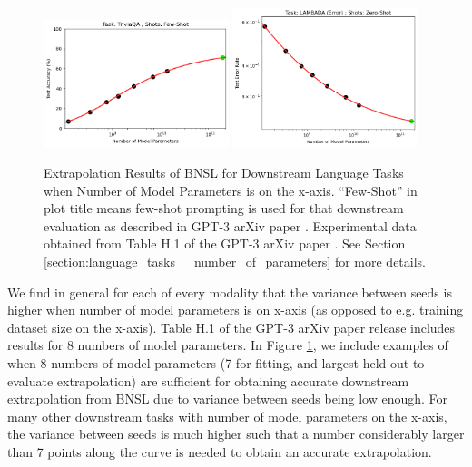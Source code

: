 \documentclass{article} %
\begin{document}
\begin{figure}[htbp]
\includegraphics[width=0.48\textwidth]{figures/gpt-3__parameter_scaling/TriviaQA___Few-Shot.png}
\includegraphics[width=0.48\textwidth]{figures/gpt-3__parameter_scaling/LAMBADA__Error____Zero-Shot.png}
    \caption{
Extrapolation Results of BNSL for Downstream Language Tasks when Number of Model Parameters is on the x-axis. ``Few-Shot'' in plot title means few-shot prompting is used for that downstream evaluation as described in GPT-3 arXiv paper \citep{brown2020language}. Experimental data obtained from Table H.1 of the GPT-3 arXiv paper \citep{brown2020language}.
See Section \ref{section:language_tasks__number_of_parameters} for more details.
    }
    \label{fig:language_tasks__number_of_parameters}
\end{figure}

We find in general for each of every modality that the variance between seeds is higher when number of model parameters is on x-axis (as opposed to e.g. training dataset size on the x-axis). Table H.1 of the GPT-3 arXiv paper \citep{brown2020language} release includes results for 8 numbers of model parameters. In Figure \ref{fig:language_tasks__number_of_parameters}, we include examples of when 8 numbers of model parameters (7 for fitting, and largest held-out to evaluate extrapolation) are sufficient for obtaining accurate downstream extrapolation from BNSL due to variance between seeds being low enough. For many other downstream tasks with number of model parameters on the x-axis, the variance between seeds is much higher such that a number considerably larger than 7 points along the curve is needed to obtain an accurate extrapolation.
\end{document}

